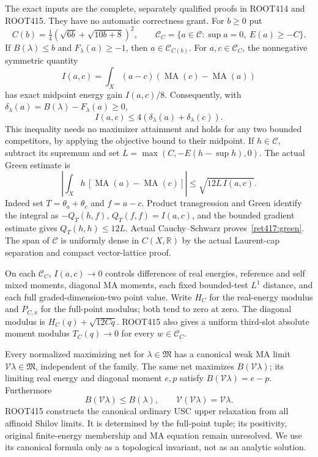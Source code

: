 \documentclass[11pt]{article}
\newcommand{\MA}{\operatorname{MA}}
\newcommand{\C}{\mathcal C}
\newcommand{\R}{\mathbb R}
\newcommand{\M}{\mathfrak M}
\newcommand{\V}{\mathcal V}
\begin{document}
The exact inputs are the complete, separately qualified proofs in
ROOT414 and ROOT415. They have no automatic correctness grant.
For $b\ge0$ put
\[
 C(b)=\tfrac14(\sqrt{6b}+\sqrt{10b+8})^2,\qquad
 \C_C=\{a\in\C:\sup a=0,\ E(a)\ge-C\}.
\]
If $B(\lambda)\le b$ and $F_\lambda(a)\ge-1$, then $a\in\C_{C(b)}$.
For $a,c\in\C_C$, the nonnegative symmetric quantity
\[
 I(a,c)=\int_X(a-c)(\MA(c)-\MA(a))
\]
has exact midpoint energy gain $I(a,c)/8$. Consequently, with
$\delta_\lambda(a)=B(\lambda)-F_\lambda(a)\ge0$,
\begin{equation}\label{ret417:mid}
 I(a,c)\le4(\delta_\lambda(a)+\delta_\lambda(c)).
\end{equation}
This inequality needs no maximizer attainment and holds for any two
bounded competitors, by applying the objective bound to their midpoint.
If $h\in\C$, subtract its supremum and set
$L=\max(C,-E(h-\sup h),0)$. The actual Green estimate is
\begin{equation}\label{ret417:green}
 \left|\int_Xh\,[\MA(a)-\MA(c)]\right|
       \le\sqrt{12L\,I(a,c)}.
\end{equation}
Indeed set $T=\theta_a+\theta_c$ and $f=a-c$. Product
transgression and Green identify the integral as $-Q_T(h,f)$,
$Q_T(f,f)=I(a,c)$, and the bounded gradient estimate gives
$Q_T(h,h)\le12L$. Actual Cauchy--Schwarz proves~\eqref{ret417:green}.
The span of $\C$ is uniformly dense in $C(X,\R)$ by the actual
Laurent-cap separation and compact vector-lattice proof.

On each $\C_C$, $I(a,c)\to0$ controls differences of real energies,
reference and self mixed moments, diagonal MA moments, each fixed
bounded-test $L^1$ distance, and each full graded-dimension-two point
value. Write $H_C$ for the real-energy modulus and
$P_{C,x}$ for the full-point modulus; both tend to zero at zero.
The diagonal modulus is $H_C(q)+\sqrt{12Cq}$.
ROOT415 also gives a uniform third-slot absolute moment modulus
$T_C(q)\to0$ for every $w\in\C_C$.

Every normalized maximizing net for $\lambda\in\M$ has a canonical
weak MA limit $\V\lambda\in\M$, independent of the family. The same
net maximizes $B(\V\lambda)$; its limiting real energy and diagonal
moment $e,p$ satisfy $B(\V\lambda)=e-p$. Furthermore
\begin{equation}\label{ret417:retr}
 B(\V\lambda)\le B(\lambda),\qquad \V(\V\lambda)=\V\lambda.
\end{equation}
ROOT415 constructs the canonical ordinary USC upper relaxation from
all affinoid Shilov limits. It is determined by the full-point tuple;
its positivity, original finite-energy membership and MA equation
remain unresolved. We use its canonical formula only as a topological
invariant, not as an analytic solution.
\end{document}
